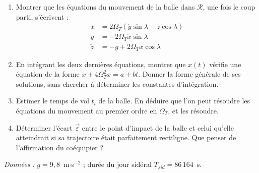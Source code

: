 \begin{enumerate}

	\item Montrer que les équations du mouvement de la balle dans $\mathcal{R}$, une fois le coup parti, s'écrivent :
	\begin{align*}
		\ddot{x}&=2\Omega_T\left(\dot{y}\sin\lambda-\dot{z}\cos\lambda\right)\\
		\ddot{y}&=-2\Omega_T\dot{x}\sin\lambda \\
		\ddot{z}&=-g+2\Omega_T\dot{x}\cos\lambda
	\end{align*}

	\item En intégrant les deux dernières équations, montrer que $x(t)$ vérifie une équation de la forme $\ddot{x}+4\Omega_T^2x=a+bt$. Donner la forme générale de ses solutions, sans chercher à déterminer les constantes d'intégration.

	\item Estimer le temps de vol $t_i$ de la balle. En déduire que l'on peut résoudre les équations du mouvement au premier ordre en $\Omega_T$, et les résoudre.

	\item Déterminer l'écart $\vec{\varepsilon}$ entre le point d'impact de la balle et celui qu'elle atteindrait si sa trajectoire était parfaitement rectiligne. Que penser de l'affirmation du coéquipier ?

\end{enumerate}

\textit{Données :} $g=9{,}8$~m$\cdot$s$^{-2}$ ; durée du jour sidéral $T_{sid}=86\,164$~s.

\newpage

